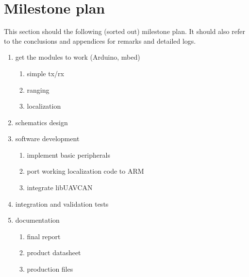 \section{Milestone plan}
This section should the following (sorted out) milestone plan. It should also refer to the conclusions and appendices for remarks and detailed logs.

\begin{enumerate}
\item get the modules to work (Arduino, mbed)
	\begin{enumerate}
	\item simple tx/rx
	\item ranging
	\item localization
	\end{enumerate}
\item schematics design
\item software development
	\begin{enumerate}
	\item implement basic peripherals
	\item port working localization code to ARM
	\item integrate libUAVCAN 
	\end{enumerate}
\item integration and validation tests
\item documentation 
	\begin{enumerate}
	\item final report
	\item product datasheet
	\item production files
	\end{enumerate}
\end{enumerate}
